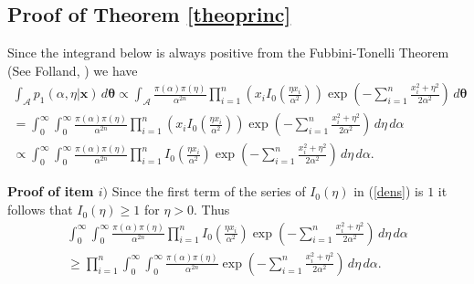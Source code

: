 \documentclass[12pt]{interact}
\theoremstyle{plain}%
\theoremstyle{definition}
\theoremstyle{remark}
\begin{document}
\begin{appendix}    

\section{Proof of Theorem \ref{theoprinc}}

Since the integrand below is always positive from the Fubbini-Tonelli Theorem (See Folland, \cite{folland}) we have
\begin{equation*}
\begin{aligned}
\int_{\mathcal{A}} p_1(\alpha,\eta|\boldsymbol{x})\, d\boldsymbol{\theta} \propto \int_{\mathcal{A}} 
 \frac{\pi(\alpha)\pi(\eta)}{ \alpha^{2n}}\prod_{i=1}^{n}\left(x_iI_0\left( \frac{\eta x_i}{\alpha^2} \right)\right) \exp\left( -\sum_{i=1}^{n}\frac{x_i^2 + \eta^2}{2\alpha^2} \right)\, d\boldsymbol{\theta}\\
= \int_0^\infty \int_0^\infty\frac{\pi(\alpha)\pi(\eta)}{\alpha^{2n}}\prod_{i=1}^{n}\left(x_iI_0\left( \frac{\eta x_i}{\alpha^2} \right)\right) \exp\left( -\sum_{i=1}^{n}\frac{x_i^2 + \eta^2}{2\alpha^2} \right)\, d\eta\, d\alpha\\
\propto \int_0^\infty \int_0^\infty\frac{\pi(\alpha)\pi(\eta)}{\alpha^{2n}}\prod_{i=1}^{n}I_0\left( \frac{\eta x_i}{\alpha^2} \right) \exp\left( -\sum_{i=1}^{n}\frac{x_i^2 + \eta^2}{2\alpha^2} \right)\, d\eta\, d\alpha.
\end{aligned}
\end{equation*}

\noindent\textbf{Proof of item $i)$} Since the first term of the series of $I_0(\eta)$ in (\ref{dens}) is $1$ it follows that $I_0(\eta) \geq 1$ for $\eta>0$. Thus
\begin{equation*}
\begin{aligned}
\int_0^\infty \int_0^\infty\frac{\pi(\alpha)\pi(\eta)}{\alpha^{2n}}\prod_{i=1}^{n}I_0\left( \frac{\eta x_i}{\alpha^2} \right) \exp\left( -\sum_{i=1}^{n}\frac{x_i^2 + \eta^2}{2\alpha^2} \right)\, d\eta\, d\alpha\\
\geq \prod_{i=1}^{n}\int_0^\infty 
 \int_0^\infty\frac{\pi(\alpha)\pi(\eta)}{ \alpha^{2n}}\exp\left( -\sum_{i=1}^{n}\frac{x_i^2 + \eta^2}{2\alpha^2} \right)\, d\eta \, d\alpha.
\end{aligned}
\end{equation*}


\end{appendix}
\end{document}
